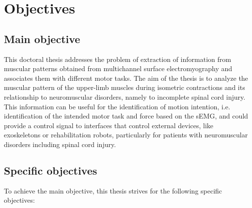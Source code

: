      \section{Objectives}
     
     	\subsection*{Main objective}

This doctoral thesis addresses the problem of extraction of information from muscular patterns obtained from multichannel surface electromyography and associates them with different motor tasks. The aim of the thesis is to analyze the muscular pattern of the upper-limb muscles during isometric contractions and its relationship to neuromuscular disorders, namely to incomplete spinal cord injury. This information can be useful for the identification of motion intention, i.e. identification of the intended motor task and force based on the sEMG, and could provide a control signal to interfaces that control external devices, like exoskeletons or rehabilitation robots, particularly for patients with neuromuscular disorders including spinal cord injury.

      
        \subsection*{Specific objectives}
        
To achieve the main objective, this thesis strives for the following specific objectives:

